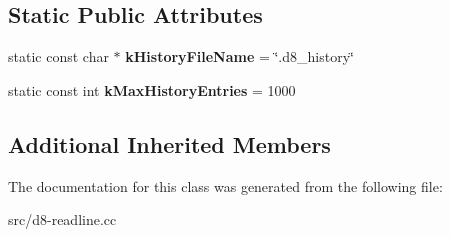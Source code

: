 \subsection*{Static Public Attributes}
\begin{DoxyCompactItemize}
\item 
\hypertarget{classv8_1_1_read_line_editor_a23c94d1cc9bdcf7b8d7a7f7b3809d0cd}{}static const char $\ast$ {\bfseries k\+History\+File\+Name} = \char`\"{}.d8\+\_\+history\char`\"{}\label{classv8_1_1_read_line_editor_a23c94d1cc9bdcf7b8d7a7f7b3809d0cd}

\item 
\hypertarget{classv8_1_1_read_line_editor_acc05c6799349aa717268f8d60a3e11f3}{}static const int {\bfseries k\+Max\+History\+Entries} = 1000\label{classv8_1_1_read_line_editor_acc05c6799349aa717268f8d60a3e11f3}

\end{DoxyCompactItemize}
\subsection*{Additional Inherited Members}


The documentation for this class was generated from the following file\+:\begin{DoxyCompactItemize}
\item 
src/d8-\/readline.\+cc\end{DoxyCompactItemize}
